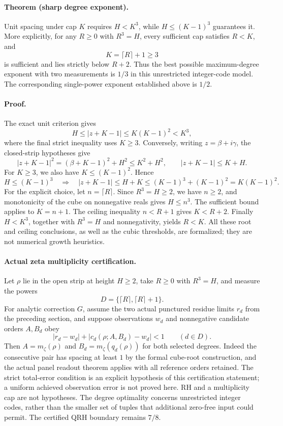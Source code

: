 \paragraph{Theorem (sharp degree exponent).}
Unit spacing under cap \(K\) requires \(H<K^3\), while
\(H\le(K-1)^3\) guarantees it. More explicitly, for any \(R\ge0\) with
\(R^3=H\), every sufficient cap satisfies \(R<K\), and
\[
 K=\lceil R\rceil+1\ge3
\]
is sufficient and lies strictly below \(R+2\).
Thus the best possible maximum-degree exponent with two measurements is
\(1/3\) in this unrestricted integer-code model. The corresponding
single-power exponent established above is \(1/2\).

\paragraph{Proof.}
The exact unit criterion gives
\[
 H\le|z+K-1|\le K(K-1)^2<K^3,
\]
where the final strict inequality uses \(K\ge3\).
Conversely, writing \(z=\beta+i\gamma\), the closed-strip hypotheses give
\[
 |z+K-1|^2=(\beta+K-1)^2+H^2\le K^2+H^2,
 \qquad |z+K-1|\le K+H.
\]
For \(K\ge3\), we also have \(K\le(K-1)^2\). Hence
\[
 H\le(K-1)^3\quad\Longrightarrow\quad
 |z+K-1|\le H+K\le(K-1)^3+(K-1)^2=K(K-1)^2.
\]
For the explicit choice, let \(n=\lceil R\rceil\).
Since \(R^3=H\ge2\), we have \(n\ge2\), and monotonicity of the cube on
nonnegative reals gives \(H\le n^3\). The sufficient bound applies to
\(K=n+1\). The ceiling inequality \(n<R+1\) gives \(K<R+2\).
Finally \(H<K^3\), together with \(R^3=H\) and nonnegativity, yields \(R<K\).
All these root and ceiling conclusions, as well as the cubic thresholds,
are formalized; they are not numerical growth heuristics.

\paragraph{Actual zeta multiplicity certification.}
Let \(\rho\) lie in the open strip at height \(H\ge2\), take
\(R\ge0\) with \(R^3=H\), and measure the powers
\[
 D=\{\lceil R\rceil,\lceil R\rceil+1\}.
\]
For analytic correction \(G\), assume the two actual punctured residue limits
\(r_d\) from the preceding section, and suppose observations \(w_d\) and
nonnegative candidate orders \(A,B_d\) obey
\[
 |r_d-w_d|+|c_d(\rho;A,B_d)-w_d|<1\qquad(d\in D).
\]
Then \(A=m_\zeta(\rho)\) and
\(B_d=m_\zeta(q_d(\rho))\) for both selected degrees.
Indeed the consecutive pair has spacing at least \(1\) by the formal
cube-root construction, and the actual panel readout theorem applies with
all reference orders retained. The strict total-error condition is an explicit hypothesis of this
certification statement; a uniform achieved observation
error is not proved here. RH and a multiplicity cap are not hypotheses.
The degree optimality concerns unrestricted integer codes, rather than the
smaller set of tuples that additional zero-free input could permit.
The certified QRH boundary remains \(7/8\).


